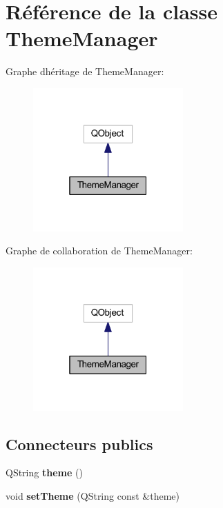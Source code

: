 \hypertarget{class_theme_manager}{}\section{Référence de la classe Theme\+Manager}
\label{class_theme_manager}


Graphe d\textquotesingle{}héritage de Theme\+Manager\+:
\nopagebreak
\begin{figure}[H]
\begin{center}
\leavevmode
\includegraphics[width=163pt]{class_theme_manager__inherit__graph}
\end{center}
\end{figure}


Graphe de collaboration de Theme\+Manager\+:
\nopagebreak
\begin{figure}[H]
\begin{center}
\leavevmode
\includegraphics[width=163pt]{class_theme_manager__coll__graph}
\end{center}
\end{figure}
\subsection*{Connecteurs publics}
\begin{DoxyCompactItemize}
\item 
Q\+String {\bfseries theme} ()\hypertarget{class_theme_manager_accbbfe5ffc08e825f81dbe017fdd8055}{}\label{class_theme_manager_accbbfe5ffc08e825f81dbe017fdd8055}

\item 
void {\bfseries set\+Theme} (Q\+String const \&theme)\hypertarget{class_theme_manager_a5f360969d2cd1fccf3fd204494e262de}{}\label{class_theme_manager_a5f360969d2cd1fccf3fd204494e262de}

\end{DoxyCompactItemize}
